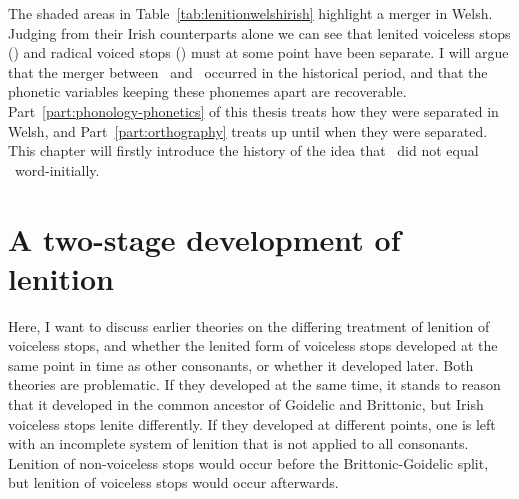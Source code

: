 The shaded areas in Table~\ref{tab:lenitionwelshirish} highlight a merger in Welsh. Judging from their Irish counterparts alone we can see that lenited voiceless stops (\lT) and radical voiced stops (\xD) must at some point have been separate.  I will argue that the merger between \lT\ and \xD\ occurred in the historical period, and that the phonetic variables keeping these phonemes apart are recoverable. Part~\ref{part:phonology-phonetics} of this thesis treats how they were separated in Welsh, and Part~\ref{part:orthography} treats  up until when they were separated. This chapter will firstly introduce the history of the idea that \lT\ did not equal \xD\ word-initially.

\section{A two-stage development of lenition}
Here, I want to discuss earlier theories on the differing treatment of lenition of voiceless stops, and whether the lenited form of voiceless stops developed at the same point in time as other consonants, or whether it developed later. Both theories are problematic. If they developed at the same time, it stands to reason that it developed in the common ancestor of Goidelic and Brittonic, but Irish voiceless stops lenite differently. If they developed at different points, one is left with an incomplete system of lenition that is not applied to all consonants. Lenition of non-voiceless stops would occur before the Brittonic-Goidelic split, but lenition of voiceless stops would occur afterwards. 

